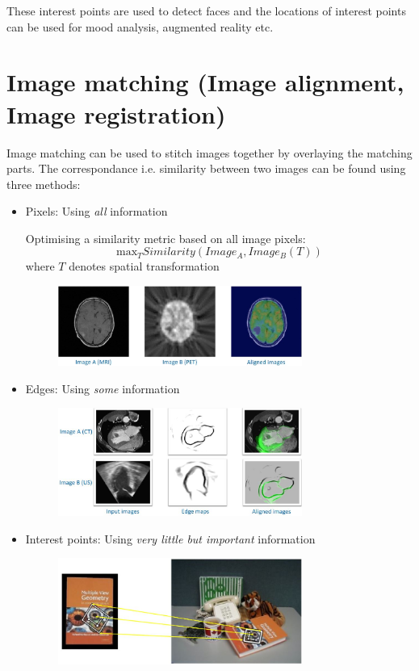 \documentclass{report}
\begin{document}
These interest points are used to detect faces and the locations of interest
points can be used for mood analysis, augmented reality etc. 

\section{Image matching (Image alignment, Image registration)}

Image matching can be used to stitch images together by overlaying the matching
parts. The correspondance i.e. similarity between two images can be found using three methods:
\begin{itemize}
    \item Pixels: Using \textit{all} information 
    
    Optimising a similarity metric based on all image pixels:
    $$
        \text{max}_T Similarity(Image_A, Image_B(T))
    $$
    where $T$ denotes spatial transformation

    \begin{figure}[h!]
        \centering
        \includegraphics[width=8cm]{matching pixels.JPG}
    \end{figure}

    \pagebreak

    \item Edges: Using \textit{some} information 
    \begin{figure}[h!]
        \centering
        \includegraphics[width=8cm]{matching edges.JPG}
    \end{figure}

    \item Interest points: Using \textit{very little but important} information 
    \begin{figure}[h!]
        \centering
        \includegraphics[width=8cm]{matching interest point.JPG}
    \end{figure}
\end{itemize}
\end{document}
